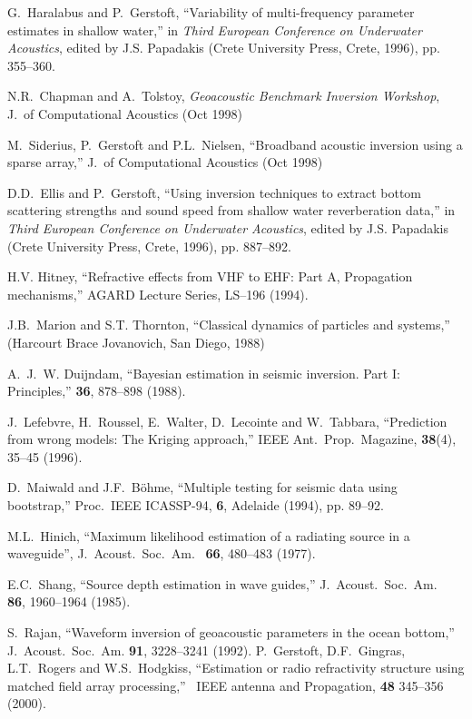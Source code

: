 \documentclass{saclantc}
\begin{document}
\begin{thebibliography}{11}
 G.~Haralabus and P.~Gerstoft, ``Variability
of multi-frequency parameter estimates in shallow water,'' in 
{\it Third European Conference on Underwater Acoustics}, 
edited by J.S. Papadakis (Crete University Press, Crete,
1996), pp. 355--360.

N.R.\ Chapman and A.\ Tolstoy, {\it Geoacoustic Benchmark Inversion Workshop},
 {J.\ of Computational
Acoustics} (Oct 1998)


M.\ Siderius, P.\ Gerstoft and P.L.~Nielsen, ``Broadband acoustic
inversion using a sparse array,'' {J.\ of Computational
Acoustics} (Oct 1998)

D.D.~Ellis and P.~Gerstoft, ``Using inversion techniques to
extract bottom scattering strengths and sound speed from shallow water
reverberation data,'' in
{\it Third European Conference on Underwater Acoustics}, 
edited by J.S. Papadakis (Crete University Press, Crete,
1996), pp. 887--892.

H.V. Hitney, ``Refractive effects from VHF to EHF: Part A, Propagation
mechanisms,''   AGARD Lecture Series, LS--196 (1994).

J.B.~Marion and S.T. Thornton, ``Classical dynamics of particles and systems,''
(Harcourt Brace Jovanovich, San Diego, 1988)


A.~J.~W. Duijndam,
\newblock ``Bayesian estimation in seismic inversion. Part I: Principles,''
 {\bf 36}, 878--898 (1988).


 J.\ Lefebvre,  H.~Roussel,  E.\ Walter, 
 D.\ Lecointe and  W.\ Tabbara,  ``Prediction from wrong models: 
The Kriging approach,''  {IEEE Ant.\ Prop.\ Magazine}, {\bf 38}(4), 
35--45 (1996).

D.~Maiwald and J.F.~B\"ohme,
``Multiple testing for seismic data using bootstrap,''
      Proc.~IEEE ICASSP-94, {\bf 6}, Adelaide (1994), pp. 89--92.

M.L.\ Hinich, ``Maximum likelihood estimation of a radiating source in
a waveguide'', 
{J.~Acoust.~Soc.~Am.\ } {\bf 66}, 480--483 (1977).

E.C.\ Shang, ``Source depth estimation in wave guides,'' 
{J.~Acoust.~Soc.~Am.\ } {\bf 86}, 1960--1964 (1985).


S.~Rajan, ``Waveform inversion of geoacoustic parameters 
in the ocean bottom,'' { J.~Acoust.~Soc.~Am.} {\bf 91}, 3228--3241 (1992).
 P.~Gerstoft, D.F.\ Gingras, L.T.\ Rogers and W.S.\ Hodgkiss, ``Estimation or radio
refractivity structure using matched field array processing,''  
{\ IEEE antenna and
Propagation},   {\bf 48} 345--356 (2000).


\end{thebibliography}
\end{document}
